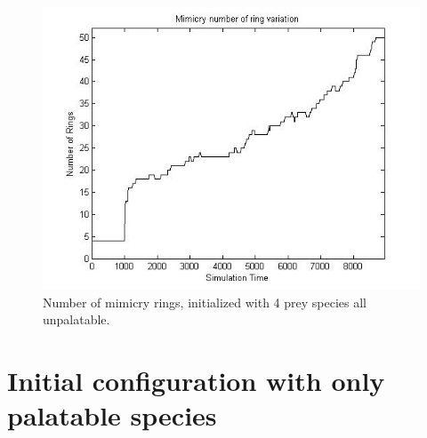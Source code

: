\begin{figure}[H]
	\centering
	\includegraphics[scale=0.50]{images/ringSize9k-4Prey-unp}
	\caption[Number of mimicry rings (4 prey species all unpalatable)]{Number of mimicry rings, initialized with 4 prey species all unpalatable.}
	\label{fig:ringSize10k-4-Prey-unp}
\end{figure}

\section{Initial configuration with only palatable species}
\label{sec:init-only-palatable-species}

